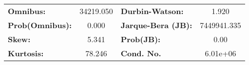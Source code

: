 \begin{center}
\begin{tabular}{lccccc}
\bottomrule
\end{tabular}
\begin{tabular}{lclc}
\textbf{Omnibus:}       & 34219.050 & \textbf{  Durbin-Watson:     } &      1.920   \\
\textbf{Prob(Omnibus):} &    0.000  & \textbf{  Jarque-Bera (JB):  } & 7449941.335  \\
\textbf{Skew:}          &    5.341  & \textbf{  Prob(JB):          } &       0.00   \\
\textbf{Kurtosis:}      &   78.246  & \textbf{  Cond. No.          } &   6.01e+06   \\
\bottomrule
\end{tabular}
\end{center}
\break